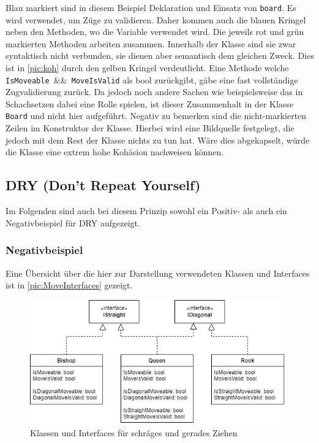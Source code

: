 \documentclass[
10pt, %
a4paper, %
oneside, %
headinclude,footinclude, %
BCOR5mm, %
]{scrartcl}
\begin{document}
\begin{onehalfspace}
Blau markiert sind in diesem Beispiel Deklaration und Einsatz von \texttt{board}. Es wird verwendet, um Züge zu validieren. Daher kommen auch die blauen Kringel neben den Methoden, wo die Variable verwendet wird. Die jeweils rot und grün markierten Methoden arbeiten zusammen. Innerhalb der Klasse sind sie zwar syntaktisch nicht verbunden, sie dienen aber semantisch dem gleichen Zweck. Dies ist in \autoref{pic:koh} durch den gelben Kringel verdeutlicht. Eine Methode welche \texttt{IsMoveable $\&\&$ MoveIsValid} als bool zurückgibt, gäbe eine fast vollständige Zugvalidierung zurück. Da jedoch noch andere Sachen wie beispielsweise das in Schachsetzen dabei eine Rolle spielen, ist dieser Zusammenhalt in der Klasse \texttt{Board} und nicht hier aufgeführt. 
Negativ zu bemerken sind die nicht-markierten Zeilen im Konstruktor der Klasse. Hierbei wird eine Bildquelle festgelegt, die jedoch mit dem Rest der Klasse nichts zu tun hat. Wäre dies abgekapselt, würde die Klasse eine extrem hohe Kohäsion nachweisen können.




\subsection{DRY (Don't Repeat Yourself)}
Im Folgenden sind auch bei diesem Prinzip sowohl ein Positiv- als auch ein Negativbeispiel für DRY aufgezeigt. 

\subsubsection{Negativbeispiel}
Eine Übersicht über die hier zur Darstellung verwendeten Klassen und Interfaces ist in \autoref{pic:MoveInterfaces} gezeigt.

\begin{figure}[h]
	\begin{center}
		\includegraphics[width=11cm]{MoveInterfaces.png}
		\caption{\label{pic:MoveInterfaces}Klassen und Interfaces für schräges und gerades Ziehen}
	\end{center}
\end{figure}


\end{onehalfspace}
\end{document}
